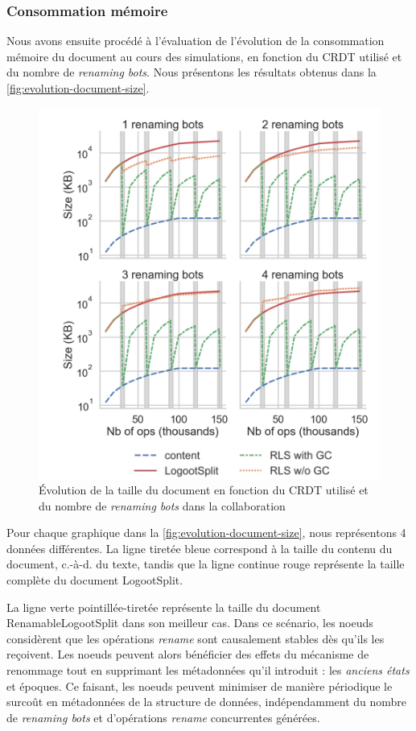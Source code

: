 \documentclass[12pt]{thesul}
\newcommand{\ie}{c.-à-d. }
\begin{document}
\subsubsection{Consommation mémoire}

Nous avons ensuite procédé à l'évaluation de l'évolution de la consommation mémoire du document au cours des simulations, en fonction du \ac{CRDT} utilisé et du nombre de \emph{renaming bots}.
Nous présentons les résultats obtenus dans la \autoref{fig:evolution-document-size}.

\begin{figure}[!ht]
  \centering
  \includegraphics[width=0.7\columnwidth]{img/snapshot-sizes-alt-legende-v2.png}
  \caption{Évolution de la taille du document en fonction du \ac{CRDT} utilisé et du nombre de \emph{renaming bots} dans la collaboration}
  \label{fig:evolution-document-size}
\end{figure}

Pour chaque graphique dans la \autoref{fig:evolution-document-size}, nous représentons 4 données différentes.
La ligne tiretée bleue correspond à la taille du contenu du document, \ie du texte, tandis que la ligne continue rouge représente la taille complète du document LogootSplit.

La ligne verte pointillée-tiretée représente la taille du document RenamableLogootSplit dans son meilleur cas.
Dans ce scénario, les noeuds considèrent que les opérations \emph{rename} sont causalement stables dès qu'ils les reçoivent.
Les noeuds peuvent alors bénéficier des effets du mécanisme de renommage tout en supprimant les métadonnées qu'il introduit : les \emph{anciens états} et époques.
Ce faisant, les noeuds peuvent minimiser de manière périodique le surcoût en métadonnées de la structure de données, indépendamment du nombre de \emph{renaming bots} et d'opérations \emph{rename} concurrentes générées.
\end{document}
